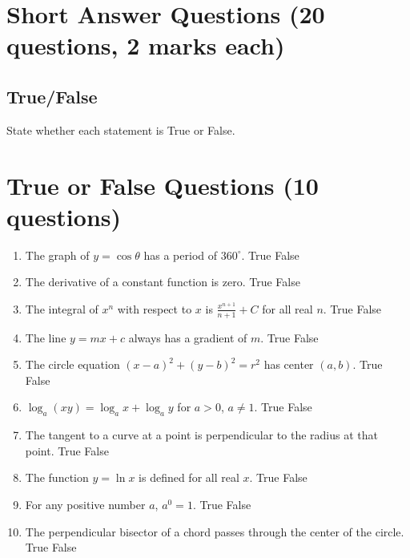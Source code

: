 \documentclass{../Templates/sbs-exam}
\begin{document}
\section*{Short Answer Questions (20 questions, 2 marks each)}

\subsection*{True/False}
State whether each statement is True or False.

\section*{True or False Questions (10 questions)}
\begin{enumerate}
    \item The graph of $y = \cos \theta$ has a period of $360^\circ$. \hfill True \quad False
    
    \item The derivative of a constant function is zero. \hfill True \quad False
    
    \item The integral of $x^n$ with respect to $x$ is $\frac{x^{n+1}}{n+1} + C$ for all real $n$. \hfill True \quad False
    
    \item The line $y = mx + c$ always has a gradient of $m$. \hfill True \quad False
    
    \item The circle equation $(x-a)^2 + (y-b)^2 = r^2$ has center $(a, b)$. \hfill True \quad False
    
    \item $\log_a (xy) = \log_a x + \log_a y$ for $a > 0$, $a \neq 1$. \hfill True \quad False
    
    \item The tangent to a curve at a point is perpendicular to the radius at that point. \hfill True \quad False
    
    \item The function $y = \ln x$ is defined for all real $x$. \hfill True \quad False
    
    \item For any positive number $a$, $a^0 = 1$. \hfill True \quad False
    
    \item The perpendicular bisector of a chord passes through the center of the circle. \hfill True \quad False
\end{enumerate}
\end{document}
